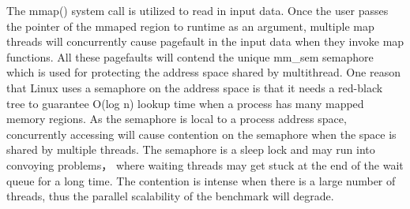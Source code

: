 The mmap() system call is utilized to read in input data. 
Once the user passes the pointer of the mmaped region to runtime as an argument, 
multiple map threads will concurrently cause pagefault in the input data when they invoke map functions.
All these pagefaults will contend the unique mm\_sem semaphore
which is used for protecting the address space shared by multithread.
One reason that Linux uses a semaphore on the address space is 
that it needs a red-black tree to guarantee O(log n)
lookup time when a process has many mapped memory regions\cite{linux}. 
As the semaphore is local to a process address space,
concurrently accessing will cause contention on the semaphore
when the space is shared by multiple threads.
The semaphore is a sleep lock and may run into convoying problems，
where waiting threads may get stuck at the end of the wait queue for a long time.\cite{Andi2009lmulticore}
The contention is intense when there is a large  number of threads,
thus the parallel scalability of the benchmark will degrade.






